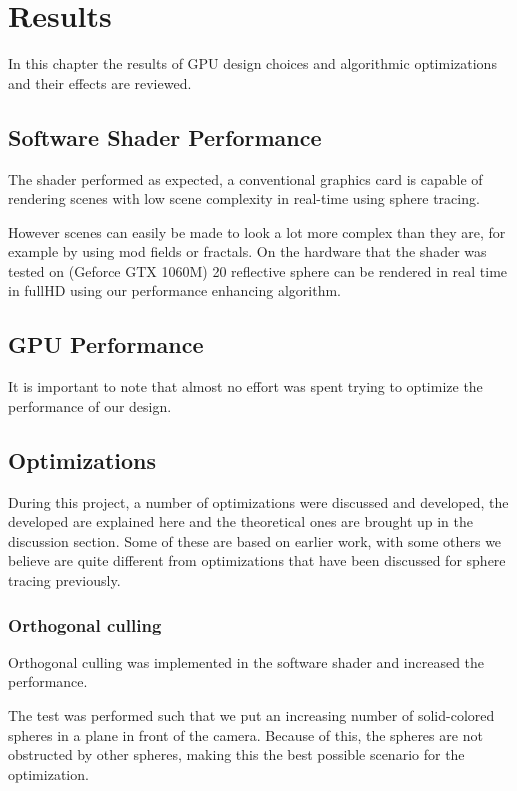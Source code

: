 \chapter{Results}

	In this chapter the results of GPU design choices and algorithmic optimizations
	and their effects are reviewed.

	\section{Software Shader Performance}

		The shader performed as expected, a conventional graphics card is 
		capable of rendering scenes with low scene complexity in real-time
		using sphere tracing.

		However scenes can easily be made to look a lot more complex than they 
		are, for example by using mod fields or fractals. On the hardware that 
		the shader was tested on (Geforce GTX 1060M) 20 reflective sphere can
		be rendered in real time in fullHD using our performance enhancing 
		algorithm.


	\section{GPU Performance}

		It is important to note that almost no effort was spent trying to
		optimize the performance of our design. 

	\section{Optimizations}
		
		During this project, a number of optimizations were discussed and
		developed, the developed are explained here and the theoretical ones
		are brought up in the discussion section. Some of these are based on
		earlier work, with some others we believe are quite different from
		optimizations that have been discussed for sphere tracing previously.

		\subsection{Orthogonal culling}

			Orthogonal culling was implemented in the software shader and
			increased the performance.

			The test was performed such that we put an increasing number of
			solid-colored spheres in a plane in front of the camera. Because of
			this, the spheres are not obstructed by other spheres, making this
			the best possible scenario for the optimization.

